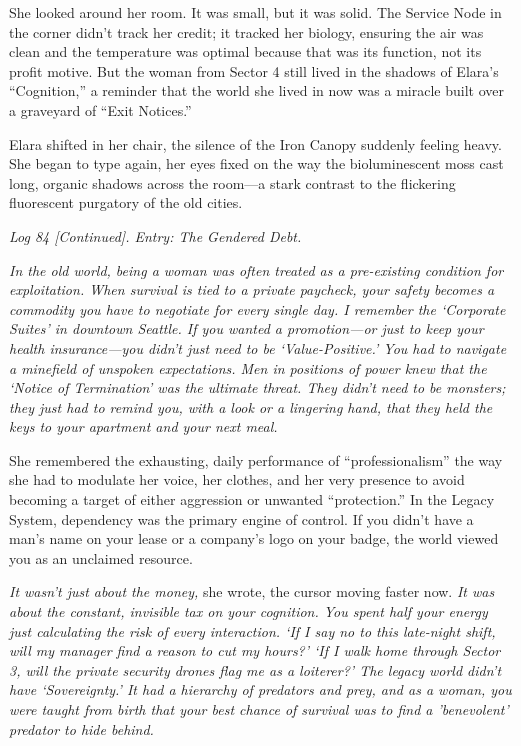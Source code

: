 She looked around her room. It was small, but it was solid. The Service Node in the corner didn't track her credit; it tracked her biology, ensuring the air was clean and the temperature was optimal because that was its function, not its profit motive. But the woman from Sector 4 still lived in the shadows of Elara's ``Cognition,'' a reminder that the world she lived in now was a miracle built over a graveyard of ``Exit Notices.''


Elara shifted in her chair, the silence of the Iron Canopy suddenly feeling heavy. She began to type again, her eyes fixed on the way the bioluminescent moss cast long, organic shadows across the room—a stark contrast to the flickering fluorescent purgatory of the old cities.

\textit{Log 84 [Continued]. Entry: The Gendered Debt.}

\textit{In the old world, being a woman was often treated as a pre-existing condition for exploitation. When survival is tied to a private paycheck, your safety becomes a commodity you have to negotiate for every single day. I remember the `Corporate Suites' in downtown Seattle. If you wanted a promotion—or just to keep your health insurance—you didn't just need to be `Value-Positive.' You had to navigate a minefield of unspoken expectations. Men in positions of power knew that the `Notice of Termination' was the ultimate threat. They didn't need to be monsters; they just had to remind you, with a look or a lingering hand, that they held the keys to your apartment and your next meal.}

She remembered the exhausting, daily performance of ``professionalism'' the way she had to modulate her voice, her clothes, and her very presence to avoid becoming a target of either aggression or unwanted ``protection.'' In the Legacy System, dependency was the primary engine of control. If you didn't have a man's name on your lease or a company's logo on your badge, the world viewed you as an unclaimed resource.

\textit{It wasn't just about the money,} she wrote, the cursor moving faster now. \textit{It was about the constant, invisible tax on your cognition. You spent half your energy just calculating the risk of every interaction. `If I say no to this late-night shift, will my manager find a reason to cut my hours?' `If I walk home through Sector 3, will the private security drones flag me as a loiterer?' The legacy world didn't have `Sovereignty.' It had a hierarchy of predators and prey, and as a woman, you were taught from birth that your best chance of survival was to find a 'benevolent' predator to hide behind.}

